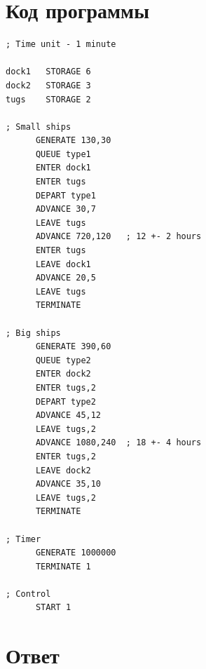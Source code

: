 \documentclass[12pt]{article}
\begin{document}
\section{Код программы}
\begin{lstlisting}
; Time unit - 1 minute

dock1	STORAGE 6
dock2	STORAGE 3
tugs	STORAGE 2

; Small ships
      GENERATE 130,30
      QUEUE type1
      ENTER dock1
      ENTER tugs
      DEPART type1
      ADVANCE 30,7
      LEAVE tugs
      ADVANCE 720,120	; 12 +- 2 hours
      ENTER tugs
      LEAVE dock1
      ADVANCE 20,5
      LEAVE tugs
      TERMINATE

; Big ships
      GENERATE 390,60
      QUEUE type2
      ENTER dock2
      ENTER tugs,2
      DEPART type2
      ADVANCE 45,12
      LEAVE tugs,2
      ADVANCE 1080,240	; 18 +- 4 hours
      ENTER tugs,2
      LEAVE dock2
      ADVANCE 35,10
      LEAVE tugs,2
      TERMINATE

; Timer
      GENERATE 1000000
      TERMINATE 1

; Control
      START 1
\end{lstlisting}

\section{Ответ}
\end{document}
